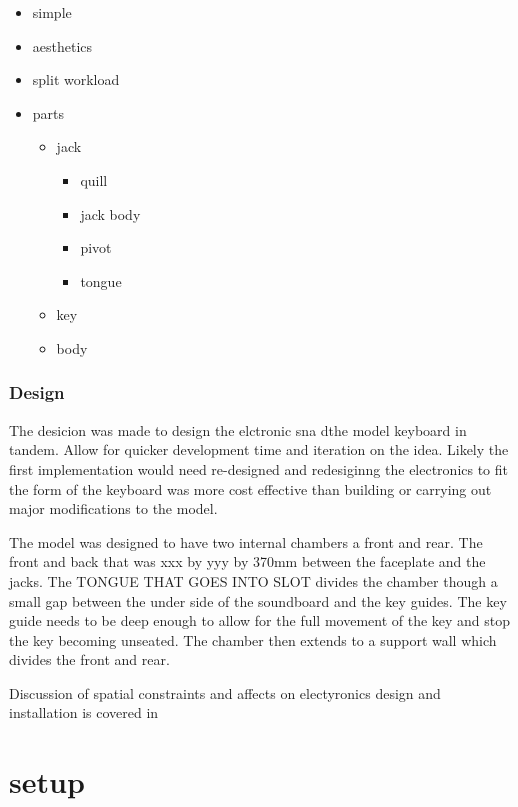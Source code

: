 \begin{itemize}
\item
  simple
\item
  aesthetics
\item
  split workload
\item
  parts

  \begin{itemize}
  \tightlist
  \item
    jack

    \begin{itemize}
    \tightlist
    \item
      quill
    \item
      jack body
    \item
      pivot
    \item
      tongue
    \end{itemize}
  \item
    key
  \item
    body
  \end{itemize}
\end{itemize}

\subsubsection{Design}\label{design}

The desicion was made to design the elctronic sna dthe model keyboard in
tandem. Allow for quicker development time and iteration on the idea.
Likely the first implementation would need re-designed and redesiginng
the electronics to fit the form of the keyboard was more cost effective
than building or carrying out major modifications to the model.

The model was designed to have two internal chambers a front and rear.
The front and back that was xxx by yyy by 370mm between the faceplate
and the jacks. The TONGUE THAT GOES INTO SLOT divides the chamber though
a small gap between the under side of the soundboard and the key guides.
The key guide needs to be deep enough to allow for the full movement of
the key and stop the key becoming unseated. The chamber then extends to
a support wall which divides the front and rear.

Discussion of spatial constraints and affects on electyronics design and
installation is covered in

\section{setup}

